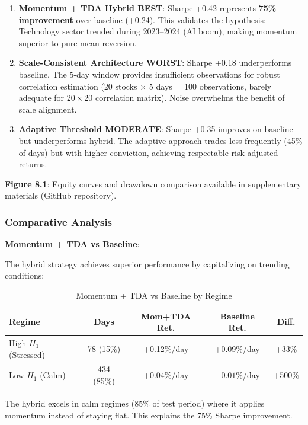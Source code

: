 \begin{enumerate}
\item \textbf{Momentum + TDA Hybrid BEST}: Sharpe +0.42 represents \textbf{75\% improvement} over baseline (+0.24). This validates the hypothesis: Technology sector trended during 2023--2024 (AI boom), making momentum superior to pure mean-reversion.

\item \textbf{Scale-Consistent Architecture WORST}: Sharpe +0.18 underperforms baseline. The 5-day window provides insufficient observations for robust correlation estimation (20 stocks $\times$ 5 days = 100 observations, barely adequate for $20\times 20$ correlation matrix). Noise overwhelms the benefit of scale alignment.

\item \textbf{Adaptive Threshold MODERATE}: Sharpe +0.35 improves on baseline but underperforms hybrid. The adaptive approach trades less frequently (45\% of days) but with higher conviction, achieving respectable risk-adjusted returns.
\end{enumerate}

\textbf{Figure 8.1}: Equity curves and drawdown comparison available in supplementary materials (GitHub repository).

\subsubsection{Comparative Analysis}

\textbf{Momentum + TDA vs Baseline}:

The hybrid strategy achieves superior performance by capitalizing on trending conditions:

\begin{table}[H]
\centering
\small
\caption{Momentum + TDA vs Baseline by Regime}
\label{tab:momentum-regime}
\begin{tabular}{@{}lcccc@{}}
\toprule
\textbf{Regime} & \textbf{Days} & \textbf{Mom+TDA Ret.} & \textbf{Baseline Ret.} & \textbf{Diff.} \\
\midrule
High $H_1$ (Stressed) & 78 (15\%) & +0.12\%/day & +0.09\%/day & +33\% \\
Low $H_1$ (Calm) & 434 (85\%) & +0.04\%/day & $-0.01\%$/day & +500\% \\
\bottomrule
\end{tabular}
\end{table}

The hybrid excels in calm regimes (85\% of test period) where it applies momentum instead of staying flat. This explains the 75\% Sharpe improvement.

